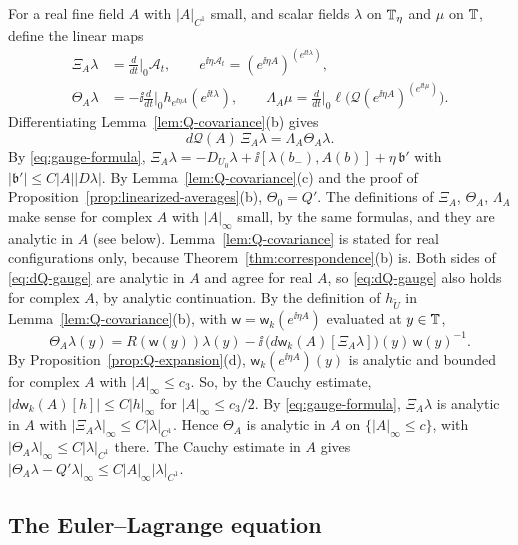 For a real fine field $A$ with $|A|_{C^1}$ small, and scalar fields $\lambda$ on $\mathbb T_\eta$ and $\mu$ on $\mathbb T$, define the linear maps
\[
\begin{aligned}
\Xi_A\lambda&=\tfrac{d}{dt}\Big|_{0}\mathcal A_t,\qquad e^{\ii\eta\mathcal A_t}=(e^{\ii\eta A})^{(e^{\ii t\lambda})},\\
\Theta_A\lambda&=-\ii\tfrac{d}{dt}\Big|_{0}h_{e^{\ii\eta A}}(e^{\ii t\lambda}),\qquad
\Lambda_A\mu=\tfrac{d}{dt}\Big|_0\ell\big(\mathcal Q(e^{\ii\eta A})^{(e^{\ii t\mu})}\big).
\end{aligned}
\]
Differentiating Lemma~\ref{lem:Q-covariance}(b) gives
\begin{equation}\label{eq:dQ-gauge}
d\mathcal Q(A)\,\Xi_A\lambda=\Lambda_A\Theta_A\lambda .
\end{equation}
By \eqref{eq:gauge-formula}, $\Xi_A\lambda=-D_{U_0}\lambda+\ii[\lambda(b_-),A(b)]+\eta\,\mathfrak b'$ with $|\mathfrak b'|\le C|A||D\lambda|$. By Lemma~\ref{lem:Q-covariance}(c) and the proof of Proposition~\ref{prop:linearized-averages}(b), $\Theta_0=Q'$. The definitions of $\Xi_A$, $\Theta_A$, $\Lambda_A$ make sense for complex $A$ with $|A|_\infty$ small, by the same formulas, and they are analytic in $A$ (see below). Lemma~\ref{lem:Q-covariance} is stated for real configurations only, because Theorem~\ref{thm:correspondence}(b) is. Both sides of \eqref{eq:dQ-gauge} are analytic in $A$ and agree for real $A$, so \eqref{eq:dQ-gauge} also holds for complex $A$, by analytic continuation. By the definition of $h_{\tilde U}$ in Lemma~\ref{lem:Q-covariance}(b), with $\mathsf w=\mathsf w_k(e^{\ii\eta A})$ evaluated at $y\in\mathbb T$,
\[
\Theta_A\lambda(y)=R(\mathsf w(y))\lambda(y)-\ii\,\big(d\mathsf w_k(A)[\Xi_A\lambda]\big)(y)\,\mathsf w(y)^{-1}.
\]
By Proposition~\ref{prop:Q-expansion}(d), $\mathsf w_k(e^{\ii\eta A})(y)$ is analytic and bounded for complex $A$ with $|A|_\infty\le c_3$. So, by the Cauchy estimate, $|d\mathsf w_k(A)[h]|\le C|h|_\infty$ for $|A|_\infty\le c_3/2$. By \eqref{eq:gauge-formula}, $\Xi_A\lambda$ is analytic in $A$ with $|\Xi_A\lambda|_\infty\le C|\lambda|_{C^1}$. Hence $\Theta_A$ is analytic in $A$ on $\{|A|_\infty\le c\}$, with $|\Theta_A\lambda|_\infty\le C|\lambda|_{C^1}$ there. The Cauchy estimate in $A$ gives $|\Theta_A\lambda-Q'\lambda|_\infty\le C|A|_\infty|\lambda|_{C^1}$.

\subsection{The Euler--Lagrange equation}\label{ss:27.2}

